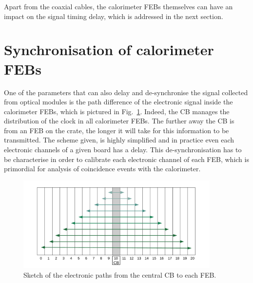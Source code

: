 Apart from the coaxial cables, the calorimeter FEBs themselves can have an impact on the signal timing delay, which is addressed in the next section.

\section{Synchronisation of calorimeter FEBs}
\label{sec:timing_FEB}

One of the parameters that can also delay and de-synchronise the signal collected from optical modules is the path difference of the electronic signal inside the calorimeter FEBs, which is pictured in Fig.~\ref{fig:FEB_scheme}.
Indeed, the CB manages the distribution of the clock in all calorimeter FEBs.
The further away the CB is from an FEB on the crate, the longer it will take for this information to be transmitted.
The scheme given, is highly simplified and in practice even each electronic channels of a given board has a delay.
This de-synchronisation has to be characterise in order to calibrate each electronic channel of each FEB, which is primordial for analysis of coincidence events with the calorimeter.
\begin{figure}[h!]
  \centering
  \includegraphics[width=0.9\textwidth]{commissioning/fig_commissioning/clock_distribution_back_plain.pdf}
  \caption{Sketch of the electronic paths from the central CB to each FEB.
    \label{fig:FEB_scheme}}
\end{figure}

